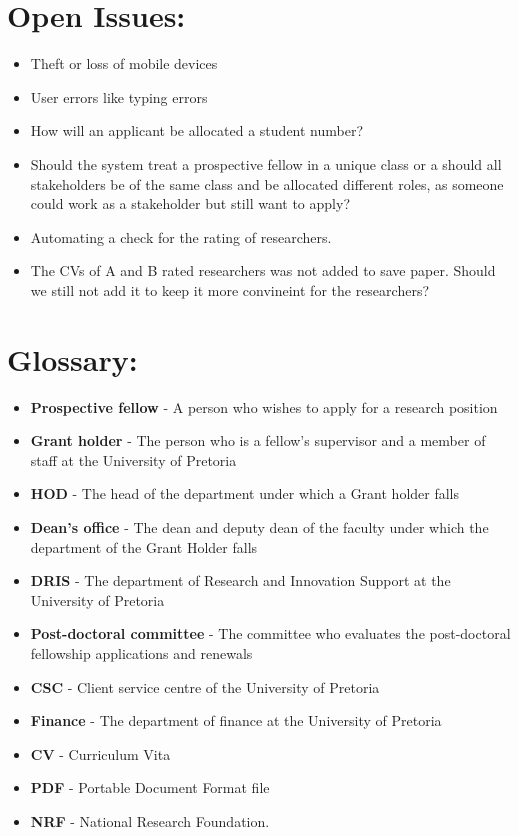 \documentclass[12pt]{article}
\begin{document}
	\newpage	
	\section{Open Issues:} %
	\vspace{0.2in}
	
	\begin{itemize}
		\item Theft or loss of mobile devices
		\item User errors like typing errors
		\item How will an applicant be allocated a student number?
		\item Should the system treat a prospective fellow in a unique class or a should all stakeholders be of the same class and be allocated different roles, as someone could work as a stakeholder but still want to apply?
		\item Automating a check for the rating of researchers.
		\item The CVs of A and B rated researchers was not added to save paper. Should we still not add it to keep it more convineint for the researchers?
	\end{itemize}
	
	
	\vspace{0.5in}
	
	\newpage
	\section{Glossary:} %
	\vspace{0.2in}
	
	\begin{itemize}
		\item \textbf{Prospective fellow} - A person who wishes to apply for a research position
		\item \textbf{Grant holder} - The person who is a fellow's supervisor and a member of staff at the University of Pretoria
		\item \textbf{HOD} - The head of the department under which a Grant holder falls
		\item \textbf{Dean's office} - The dean and deputy dean of the faculty under which the department of the Grant Holder falls
		\item \textbf{DRIS} - The department of Research and Innovation Support at the University of Pretoria
		\item \textbf{Post-doctoral committee} - The committee who evaluates the post-doctoral fellowship applications and renewals
		\item \textbf{CSC} - Client service centre of the University of Pretoria
		\item \textbf{Finance} - The department of finance at the University of Pretoria
		
		\item \textbf{CV} - Curriculum Vita
		\item \textbf{PDF} - Portable Document Format file
		\item \textbf{NRF} - National Research Foundation. 
	\end{itemize}	
		
	
	\vspace{0.5in}
		
\end{document}
